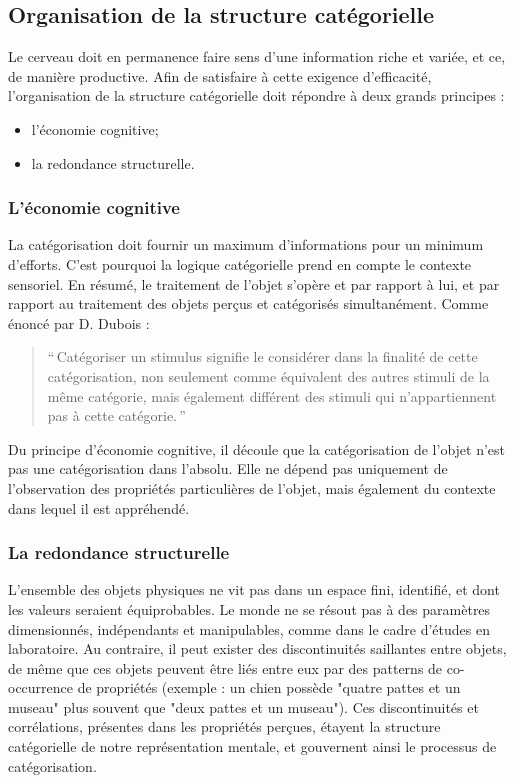 \subsection{Organisation de la structure catégorielle}

Le cerveau doit en permanence faire sens d'une information riche et variée, et ce, de manière productive. Afin de satisfaire à cette exigence d'efficacité, l'organisation de la structure catégorielle doit répondre à deux grands principes \citep[p. 29]{rosch1978cognition}:

\begin{itemize}
\item l'économie cognitive;
\item la redondance structurelle.
\end{itemize}

\subsubsection{L'économie cognitive}

La catégorisation doit fournir un maximum d'informations pour un minimum d'efforts. C'est pourquoi la logique catégorielle prend en compte le contexte sensoriel. En résumé, le traitement de l'objet s'opère et par rapport à lui, et par rapport au traitement des objets perçus et catégorisés simultanément. Comme énoncé par D. Dubois \citep[p. 33]{dubois1991semantique}:

\begin{quote}
``\,Catégoriser un stimulus signifie le considérer dans la finalité de cette catégorisation, non seulement comme équivalent des autres stimuli de la même catégorie, mais également différent des stimuli qui n'appartiennent pas à cette catégorie.\,''
\end{quote}

Du principe d'économie cognitive, il découle que la catégorisation de l'objet n'est pas une catégorisation dans l'absolu. Elle ne dépend pas uniquement de l'observation des propriétés particulières de l'objet, mais également du contexte dans lequel il est appréhendé.

\subsubsection{La redondance structurelle}

L'ensemble des objets physiques ne vit pas dans un espace fini, identifié, et dont les valeurs seraient équiprobables. Le monde ne se résout pas à des paramètres dimensionnés, indépendants et manipulables, comme dans le cadre d'études en laboratoire. Au contraire, il peut exister des discontinuités saillantes entre objets, de même que ces objets peuvent être liés entre eux par des patterns de co-occurrence de propriétés (exemple : un chien possède "quatre pattes et un museau" plus souvent que "deux pattes et un museau"). Ces discontinuités et corrélations, présentes dans les propriétés perçues, étayent la structure catégorielle de notre représentation mentale, et gouvernent ainsi le processus de catégorisation.
 
